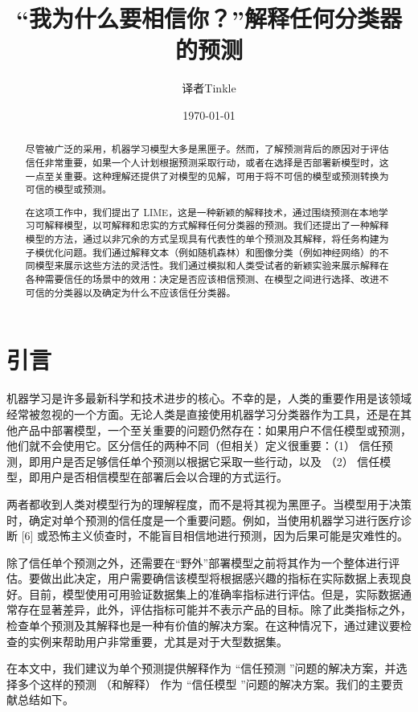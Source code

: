 \documentclass[12pt, a4paper]{ctexart} %
\title{“我为什么要相信你？”解释任何分类器的预测}
\author{译者Tinkle}
\date{\today}
\begin{document}
\maketitle{}
\begin{abstract}
    尽管被广泛的采用，机器学习模型大多是黑匣子。然而，了解预测背后的原因对于评估信任非常重要，如果一个人计划根据预测采取行动，或者在选择是否部署新模型时，这一点至关重要。这种理解还提供了对模型的见解，可用于将不可信的模型或预测转换为可信的模型或预测。
    
    在这项工作中，我们提出了 LIME，这是一种新颖的解释技术，通过围绕预测在本地学习可解释模型，以可解释和忠实的方式解释任何分类器的预测。我们还提出了一种解释模型的方法，通过以非冗余的方式呈现具有代表性的单个预测及其解释，将任务构建为子模优化问题。我们通过解释文本（例如随机森林）和图像分类（例如神经网络）的不同模型来展示这些方法的灵活性。我们通过模拟和人类受试者的新颖实验来展示解释在各种需要信任的场景中的效用：决定是否应该相信预测、在模型之间进行选择、改进不可信的分类器以及确定为什么不应该信任分类器。
\end{abstract}

\section{引言}
机器学习是许多最新科学和技术进步的核心。不幸的是，人类的重要作用是该领域经常被忽视的一个方面。无论人类是直接使用机器学习分类器作为工具，还是在其他产品中部署模型，一个至关重要的问题仍然存在：如果用户不信任模型或预测，他们就不会使用它。区分信任的两种不同（但相关）定义很重要：（1） 信任预测，即用户是否足够信任单个预测以根据它采取一些行动，以及 （2） 信任模型，即用户是否相信模型在部署后会以合理的方式运行。

两者都收到人类对模型行为的理解程度，而不是将其视为黑匣子。当模型用于决策时，确定对单个预测的信任度是一个重要问题。例如，当使用机器学习进行医疗诊断 [6] 或恐怖主义侦查时，不能盲目相信地进行预测，因为后果可能是灾难性的。

除了信任单个预测之外，还需要在“野外”部署模型之前将其作为一个整体进行评估。要做出此决定，用户需要确信该模型将根据感兴趣的指标在实际数据上表现良好。目前，模型使用可用验证数据集上的准确率指标进行评估。但是，实际数据通常存在显著差异，此外，评估指标可能并不表示产品的目标。除了此类指标之外，检查单个预测及其解释也是一种有价值的解决方案。在这种情况下，通过建议要检查的实例来帮助用户非常重要，尤其是对于大型数据集。

在本文中，我们建议为单个预测提供解释作为 “信任预测 ”问题的解决方案，并选择多个这样的预测 （和解释） 作为 “信任模型 ”问题的解决方案。我们的主要贡献总结如下。
\end{document}
